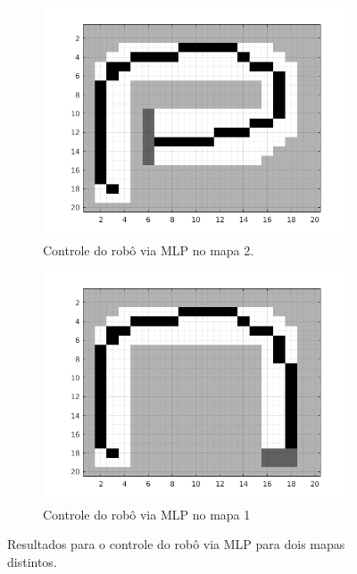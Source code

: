 \FloatBarrier
			    
	\begin{figure}[h!]
	
	\centering
	
		\begin{subfigure}{.5\textwidth}
		  \centering
		  \includegraphics[width=1\linewidth]{mlp_robot/mlp_2}
		  \caption{\centering Controle do robô via MLP no mapa 2.}
		  \label{fig:mlp_2}
		  
		\end{subfigure}%
		\begin{subfigure}{.5\textwidth}
		  \centering
		  \includegraphics[width=1\linewidth]{mlp_robot/mlp_1}
		  \caption{\centering Controle do robô via MLP no mapa 1}
		  \label{fig:mlp_1} 
		\end{subfigure}
	
	
	\caption{Resultados para o controle do robô via MLP
	para dois mapas distintos.}
	\end{figure} 
	
